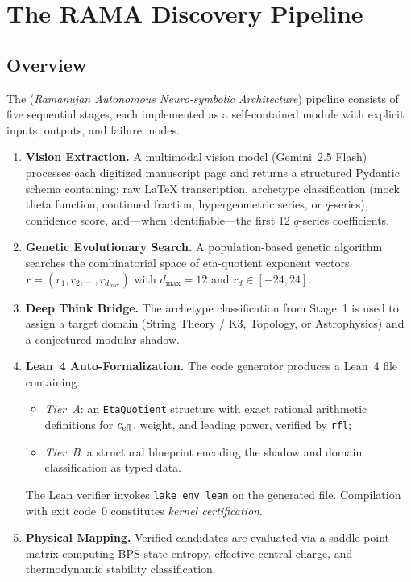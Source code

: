 \section{The RAMA Discovery Pipeline}
\label{sec:pipeline}

\subsection{Overview}

The \RAMA{} (\emph{Ramanujan Autonomous Neuro-symbolic
Architecture}) pipeline consists of five sequential stages,
each implemented as a self-contained module with explicit
inputs, outputs, and failure modes.

\begin{enumerate}[label=\textbf{Stage~\arabic*:},leftmargin=3cm]
  \item \textbf{Vision Extraction.}
    A multimodal vision model (Gemini~2.5 Flash) processes
    each digitized manuscript page and returns a structured
    Pydantic schema containing: raw \LaTeX{} transcription,
    archetype classification (mock theta function,
    continued fraction, hypergeometric series, or
    $q$-series), confidence score, and---when
    identifiable---the first 12 $q$-series coefficients.

  \item \textbf{Genetic Evolutionary Search.}
    A population-based genetic algorithm searches the
    combinatorial space of eta-quotient exponent vectors
    $\mathbf{r} = (r_1, r_2, \ldots, r_{d_{\max}})$ with
    $d_{\max} = 12$ and $r_d \in [-24, 24]$.

  \item \textbf{Deep Think Bridge.}
    The archetype classification from Stage~1 is used to
    assign a target domain (String Theory / K3, Topology,
    or Astrophysics) and a conjectured modular shadow.

  \item \textbf{Lean~4 Auto-Formalization.}
    The code generator produces a Lean~4 file containing:
    \begin{itemize}
      \item \emph{Tier~A}: an \texttt{EtaQuotient} structure
            with exact rational arithmetic definitions for
            $c_{\mathrm{eff}}$, weight, and leading power, verified by
            \texttt{rfl};
      \item \emph{Tier~B}: a structural blueprint encoding
            the shadow and domain classification as typed
            data.
    \end{itemize}
    The Lean verifier invokes \texttt{lake env lean} on
    the generated file.  Compilation with exit code~0
    constitutes \emph{kernel certification}.

  \item \textbf{Physical Mapping.}
    Verified candidates are evaluated via a saddle-point
    matrix computing BPS state entropy, effective central
    charge, and thermodynamic stability classification.
\end{enumerate}

